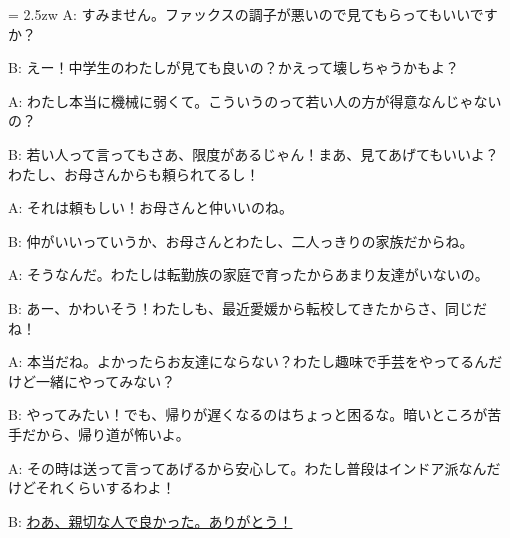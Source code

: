 \documentclass[11pt]{amsart}
\title{}
\author{}
\newenvironment{hangall}[1]{\hangindent = 2.5zw\everypar{\hangindent = 2.5zw}}{}
\begin{document}
\maketitle
\begin{hangall}{}%
A: すみません。ファックスの調子が悪いので見てもらってもいいですか？

B: えー！中学生のわたしが見ても良いの？かえって壊しちゃうかもよ？

A: わたし本当に機械に弱くて。こういうのって若い人の方が得意なんじゃないの？

B: 若い人って言ってもさあ、限度があるじゃん！まあ、見てあげてもいいよ？わたし、お母さんからも頼られてるし！

A: それは頼もしい！お母さんと仲いいのね。

B: 仲がいいっていうか、お母さんとわたし、二人っきりの家族だからね。

A: そうなんだ。わたしは転勤族の家庭で育ったからあまり友達がいないの。

B: あー、かわいそう！わたしも、最近愛媛から転校してきたからさ、同じだね！

A: 本当だね。よかったらお友達にならない？わたし趣味で手芸をやってるんだけど一緒にやってみない？

B: やってみたい！でも、帰りが遅くなるのはちょっと困るな。暗いところが苦手だから、帰り道が怖いよ。

A: その時は送って言ってあげるから安心して。わたし普段はインドア派なんだけどそれくらいするわよ！

B: \ul{わあ、親切な人で良かった。ありがとう！}\end{hangall}
\end{document}
